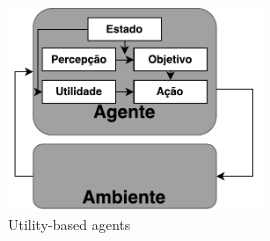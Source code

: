 \begin{figure}[ht]
	\centering
	\includegraphics[width=0.6\textwidth]{fig/agentUtility.pdf}
	\caption{Utility-based agents}
	\label{fig:agenteUtility}
\end{figure} 


